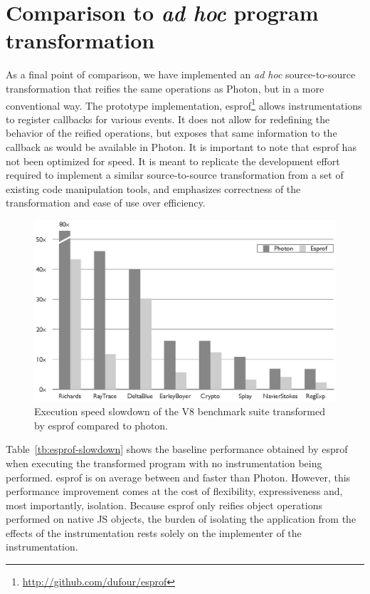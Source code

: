 \section{Comparison to \textit{ad hoc} program transformation}
\label{sec:esprof}

As a final point of comparison, we have implemented an 
\textit{ad hoc} source-to-source transformation that reifies the same
operations as Photon, but in a more conventional way. The prototype
implementation, esprof\footnote{\url{http://github.com/dufour/esprof}}
allows instrumentations to register callbacks for various events. It does not
allow for redefining the behavior of the reified operations, but exposes that
same information to the callback as would be available in Photon. It is
important to note that esprof has not been optimized for speed. It is meant to
replicate the development effort required to implement a similar
source-to-source transformation from a set of existing code manipulation tools, and
emphasizes correctness of the transformation and ease of use over efficiency.

\begin{figure}[htbp]
\begin{center}
\includegraphics[width=.85\textwidth]{figures/PhotonVSEsprof}
\caption[Execution speed slowdown of esprof vs photon]{Execution speed slowdown of the V8 benchmark suite transformed by esprof compared to photon.}
\label{fig:esprof-slowdown}
\end{center}
\end{figure}

Table~\ref{tb:esprof-slowdown} shows the baseline performance obtained by esprof when
executing the transformed program with no instrumentation being performed.
esprof is on average between  and  faster than Photon.
However, this performance improvement comes at the cost of flexibility,
expressiveness and, most importantly, isolation. Because esprof only reifies
object operations performed on native JS objects, the burden of isolating the
application from the effects of the instrumentation rests solely on the
implementer of the instrumentation.

